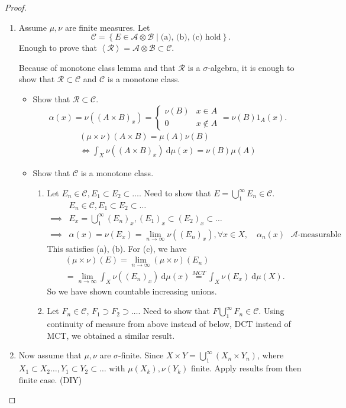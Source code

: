 \documentclass{report}
\newcommand{\cA}{\mathcal{A}}
\newcommand{\cB}{\mathcal{B}}
\newcommand{\cC}{\mathcal{C}}
\newcommand{\cR}{\mathcal{R}}
\newcommand{\df}{\ \mathrm{d}}
\newcommand{\gen}[1]{\left\langle #1 \right\rangle}
\theoremstyle{definition}
\theoremstyle{remark}
\begin{document}
\begin{proof}
	\begin{enumerate}
		\item Assume $\mu, \nu$ are finite measures. Let \[\cC = \left\{E \in \cA \otimes \cB \mid \text{(a), (b), (c) hold}\right\}.\]
		Enough to prove that $\gen{\cR} = \cA \otimes \cB \subset \cC$. 

		Because of monotone class lemma and that $\cR$ is a $\sigma$-algebra, it is enough to show that $\cR \subset \cC$ and $\cC$ is a monotone class.
		\begin{itemize}
			\item Show that $\cR \subset \cC$. \[\alpha(x) = \nu((A \times B)_x) = \begin{cases}
				\nu(B) & x \in A \\ 0 & x \notin A
			\end{cases} = \nu(B)1_A(x).\]
			\begin{multline*}
				(\mu \times \nu)(A \times B) = \mu(A)\nu(B) \\ \iff \int_X \nu((A \times B)_x)\df \mu(x) = \nu(B)\mu(A)
			\end{multline*}

			\item Show that $\cC$ is a monotone class. \begin{enumerate}
				\item Let $E_n \in \cC, E_1 \subset E_2 \subset \ldots$. Need to show that $E = \bigcup_1^\infty E_n \in \cC$. 
				\begin{align*}
					& E_n \in \cC, E_1 \subset E_2 \subset \ldots \\
					\implies & E_x = \bigcup_1^\infty (E_n)_x, (E_1)_x \subset (E_2)_x \subset \ldots \\
					\implies & \alpha(x) = \nu(E_x) = \lim_{n \to \infty} \nu\left((E_n)_x\right), \forall x \in X, \quad \alpha_n(x) \text{ $\cA$-measurable} 
				\end{align*}
				This satisfies (a), (b).
				For (c), we have
				\begin{multline*}
					(\mu \times \nu)(E) = \lim_{n \to \infty}(\mu \times \nu)(E_n) \\
					= \lim_{n \to \infty} \int_X \nu\left((E_n)_x\right) \df \mu(x) \stackrel{MCT}{=} \int_X \nu(E_x) \df \mu(X). 
				\end{multline*}
				So we have shown countable increasing unions.

				\item Let $F_n \in \cC$, $F_1 \supset F_2 \supset \ldots$. Need to show that $F \bigcup_1^\infty F_n \in \cC$. Using continuity of measure from above instead of below, DCT instead of MCT, we obtained a similar result.
			\end{enumerate}
		\end{itemize}
		\item Now assume that $\mu, \nu$ are $\sigma$-finite. Since $X \times Y = \bigcup_1^\infty (X_n \times Y_n)$, where $X_1 \subset X_2 \ldots, Y_1 \subset Y_2 \subset \ldots$ with $\mu(X_k), \nu(Y_k)$ finite. Apply results from then finite case. (DIY) \qedhere
	\end{enumerate}
\end{proof}
\end{document}
